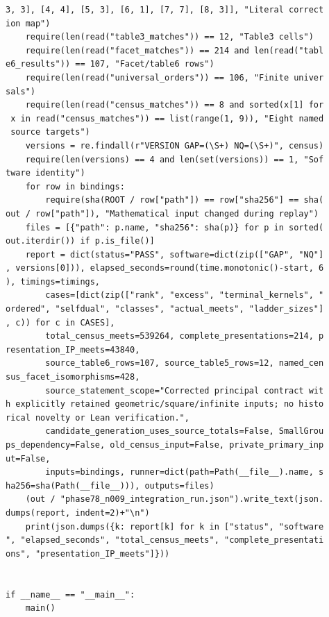 \documentclass[
  11pt,
  a4paper,
]{article}
\begin{document}
\begin{verbatim}
3, 3], [4, 4], [5, 3], [6, 1], [7, 7], [8, 3]], "Literal correct
ion map")
    require(len(read("table3_matches")) == 12, "Table3 cells")
    require(len(read("facet_matches")) == 214 and len(read("tabl
e6_results")) == 107, "Facet/table6 rows")
    require(len(read("universal_orders")) == 106, "Finite univer
sals")
    require(len(read("census_matches")) == 8 and sorted(x[1] for
 x in read("census_matches")) == list(range(1, 9)), "Eight named
 source targets")
    versions = re.findall(r"VERSION GAP=(\S+) NQ=(\S+)", census)
    require(len(versions) == 4 and len(set(versions)) == 1, "Sof
tware identity")
    for row in bindings:
        require(sha(ROOT / row["path"]) == row["sha256"] == sha(
out / row["path"]), "Mathematical input changed during replay")
    files = [{"path": p.name, "sha256": sha(p)} for p in sorted(
out.iterdir()) if p.is_file()]
    report = dict(status="PASS", software=dict(zip(["GAP", "NQ"]
, versions[0])), elapsed_seconds=round(time.monotonic()-start, 6
), timings=timings,
        cases=[dict(zip(["rank", "excess", "terminal_kernels", "
ordered", "selfdual", "classes", "actual_meets", "ladder_sizes"]
, c)) for c in CASES],
        total_census_meets=539264, complete_presentations=214, p
resentation_IP_meets=43840,
        source_table6_rows=107, source_table5_rows=12, named_cen
sus_facet_isomorphisms=428,
        source_statement_scope="Corrected principal contract wit
h explicitly retained geometric/square/infinite inputs; no histo
rical novelty or Lean verification.",
        candidate_generation_uses_source_totals=False, SmallGrou
ps_dependency=False, old_census_input=False, private_primary_inp
ut=False,
        inputs=bindings, runner=dict(path=Path(__file__).name, s
ha256=sha(Path(__file__))), outputs=files)
    (out / "phase78_n009_integration_run.json").write_text(json.
dumps(report, indent=2)+"\n")
    print(json.dumps({k: report[k] for k in ["status", "software
", "elapsed_seconds", "total_census_meets", "complete_presentati
ons", "presentation_IP_meets"]}))


if __name__ == "__main__":
    main()
\end{verbatim}
\end{document}
